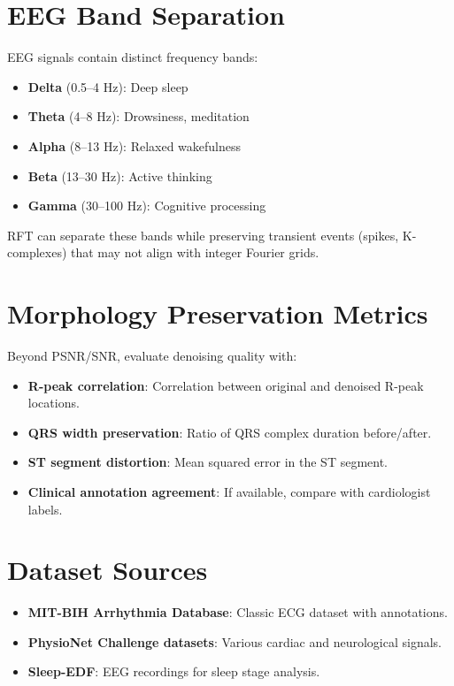 \documentclass[11pt, a4paper, openany]{book}
\theoremstyle{definition}
\begin{document}
\section{EEG Band Separation}
EEG signals contain distinct frequency bands:
\begin{itemize}
    \item \textbf{Delta} (0.5--4 Hz): Deep sleep
    \item \textbf{Theta} (4--8 Hz): Drowsiness, meditation
    \item \textbf{Alpha} (8--13 Hz): Relaxed wakefulness
    \item \textbf{Beta} (13--30 Hz): Active thinking
    \item \textbf{Gamma} (30--100 Hz): Cognitive processing
\end{itemize}

RFT can separate these bands while preserving transient events (spikes, K-complexes) that may not align with integer Fourier grids.

\section{Morphology Preservation Metrics}
Beyond PSNR/SNR, evaluate denoising quality with:
\begin{itemize}
    \item \textbf{R-peak correlation}: Correlation between original and denoised R-peak locations.
    \item \textbf{QRS width preservation}: Ratio of QRS complex duration before/after.
    \item \textbf{ST segment distortion}: Mean squared error in the ST segment.
    \item \textbf{Clinical annotation agreement}: If available, compare with cardiologist labels.
\end{itemize}

\section{Dataset Sources}
\begin{itemize}
    \item \textbf{MIT-BIH Arrhythmia Database}: Classic ECG dataset with annotations.
    \item \textbf{PhysioNet Challenge datasets}: Various cardiac and neurological signals.
    \item \textbf{Sleep-EDF}: EEG recordings for sleep stage analysis.
\end{itemize}
\end{document}
